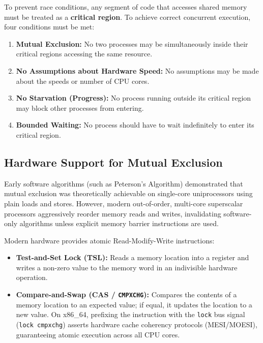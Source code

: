 To prevent race conditions, any segment of code that accesses shared memory must be treated as a \textbf{critical region}. To achieve correct concurrent execution, four conditions must be met:
\begin{enumerate}
    \item \textbf{Mutual Exclusion:} No two processes may be simultaneously inside their critical regions accessing the same resource.
    \item \textbf{No Assumptions about Hardware Speed:} No assumptions may be made about the speeds or number of CPU cores.
    \item \textbf{No Starvation (Progress):} No process running outside its critical region may block other processes from entering.
    \item \textbf{Bounded Waiting:} No process should have to wait indefinitely to enter its critical region.
\end{enumerate}

\subsection{Hardware Support for Mutual Exclusion}
Early software algorithms (such as Peterson's Algorithm) demonstrated that mutual exclusion was theoretically achievable on single-core uniprocessors using plain loads and stores. However, modern out-of-order, multi-core superscalar processors aggressively reorder memory reads and writes, invalidating software-only algorithms unless explicit memory barrier instructions are used.

Modern hardware provides atomic Read-Modify-Write instructions:
\begin{itemize}
    \item \textbf{Test-and-Set Lock (TSL):} Reads a memory location into a register and writes a non-zero value to the memory word in an indivisible hardware operation.
    \item \textbf{Compare-and-Swap (CAS / \texttt{CMPXCHG}):} Compares the contents of a memory location to an expected value; if equal, it updates the location to a new value. On x86\_64, prefixing the instruction with the \texttt{lock} bus signal (\texttt{lock cmpxchg}) asserts hardware cache coherency protocols (MESI/MOESI), guaranteeing atomic execution across all CPU cores.
\end{itemize}


